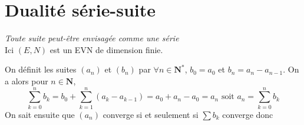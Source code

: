 \section{Dualité série-suite}
		
		\textit{Toute suite peut-être envisagée comme une série}\\
		
		Ici $(E,N)$ est un EVN de dimension finie.
		
		On définit les suites $(a_n)$ et $(b_n)$ par $\forall n\in\mathbf{N}^*$, $b_0 = a_0$ et $b_n = a_n - a_{n-1}$. On a alors pour $n\in \mathbf{N}$,
		\[ 
			\sum_{k=0}^{n} b_k = b_0 + \sum_{k=1}^{n} (a_k - a_{k-1} ) = a_0 +a_n - a_0 = a_n \text{  soit  } a_n = \sum_{k=0}^{n} b_k
		\]
		On sait ensuite que $(a_n)$ converge si et seulement si $\sum b_k$ converge donc 
		
		\begin{center}
		\end{center} ${}$ \\


		\fin